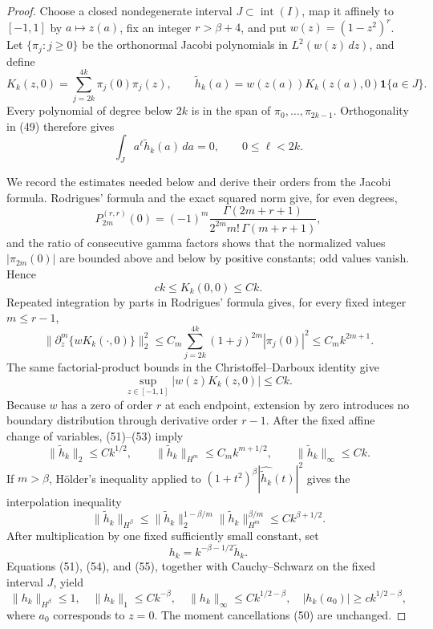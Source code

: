 \documentclass{article}
\begin{document}
\begin{proof}
Choose a closed nondegenerate interval \(J\subset\operatorname{int}(I)\), map it affinely to \([-1,1]\) by \(a\mapsto z(a)\), fix an integer \(r>\beta+4\), and put \(w(z)=(1-z^2)^r\).  Let \(\{\pi_j:j\ge0\}\) be the orthonormal Jacobi polynomials in \(L^2(w(z)\,dz)\), and define
\[
K_k(z,0)=\sum_{j=2k}^{4k}\pi_j(0)\pi_j(z),
\qquad
\widetilde h_k(a)=w(z(a))K_k(z(a),0)\mathbf 1\{a\in J\}. \tag{49}
\]
Every polynomial of degree below \(2k\) is in the span of \(\pi_0,\ldots,\pi_{2k-1}\).  Orthogonality in (49) therefore gives
\[
\int_J a^\ell\widetilde h_k(a)\,da=0,
\qquad 0\le\ell<2k. \tag{50}
\]

We record the estimates needed below and derive their orders from the Jacobi formula.  Rodrigues' formula and the exact squared norm give, for even degrees,
\[
P_{2m}^{(r,r)}(0)
=(-1)^m\frac{\Gamma(2m+r+1)}{2^{2m}m!\,\Gamma(m+r+1)},
\]
and the ratio of consecutive gamma factors shows that the normalized values \(|\pi_{2m}(0)|\) are bounded above and below by positive constants; odd values vanish.  Hence
\[
c k\le K_k(0,0)\le Ck. \tag{51}
\]
Repeated integration by parts in Rodrigues' formula gives, for every fixed integer \(m\le r-1\),
\[
\|\partial_z^m\{wK_k(\cdot,0)\}\|_2^2
\le C_m\sum_{j=2k}^{4k}(1+j)^{2m}|\pi_j(0)|^2
\le C_m k^{2m+1}. \tag{52}
\]
The same factorial-product bounds in the Christoffel--Darboux identity give
\[
\sup_{z\in[-1,1]}|w(z)K_k(z,0)|\le Ck. \tag{53}
\]
Because \(w\) has a zero of order \(r\) at each endpoint, extension by zero introduces no boundary distribution through derivative order \(r-1\).  After the fixed affine change of variables, (51)--(53) imply
\[
\|\widetilde h_k\|_2\le Ck^{1/2},
\qquad
\|\widetilde h_k\|_{H^m}\le C_mk^{m+1/2},
\qquad
\|\widetilde h_k\|_\infty\le Ck. \tag{54}
\]
If \(m>\beta\), Hölder's inequality applied to
\((1+t^2)^\beta|\widehat{\widetilde h_k}(t)|^2\) gives the interpolation inequality
\[
\|\widetilde h_k\|_{H^\beta}
\le\|\widetilde h_k\|_2^{1-\beta/m}
\|\widetilde h_k\|_{H^m}^{\beta/m}
\le Ck^{\beta+1/2}. \tag{55}
\]
After multiplication by one fixed sufficiently small constant, set
\[
h_k=k^{-\beta-1/2}\widetilde h_k.
\]
Equations (51), (54), and (55), together with Cauchy--Schwarz on the fixed interval \(J\), yield
\[
\|h_k\|_{H^\beta}\le1,
\quad \|h_k\|_1\le Ck^{-\beta},
\quad \|h_k\|_\infty\le Ck^{1/2-\beta},
\quad |h_k(a_0)|\ge ck^{1/2-\beta}, \tag{56}
\]
where \(a_0\) corresponds to \(z=0\).  The moment cancellations (50) are unchanged.


\end{proof}
\end{document}
